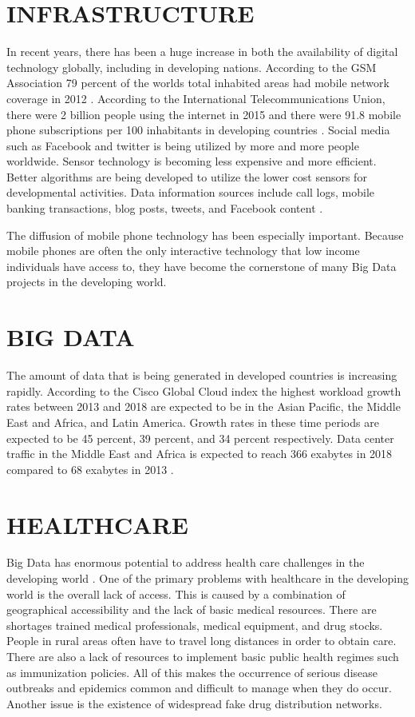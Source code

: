\documentclass[sigconf]{acmart}
\begin{document}
\section{INFRASTRUCTURE}
In recent years, there has been a huge increase in both the availability of digital technology globally, including in developing nations. According to the GSM Association 79 percent of the worlds total inhabited areas had mobile network coverage in 2012 \cite{DevEcon}. According to the International Telecommunications Union, there were 2 billion people using the internet in 2015 and there were 91.8 mobile phone subscriptions per 100 inhabitants in developing countries \cite{DevEcon}.  Social media such as Facebook and twitter is being utilized by more and more people worldwide. Sensor technology is becoming less expensive and more efficient. Better algorithms are being developed to utilize the lower cost sensors for developmental activities. Data information sources include call logs, mobile banking transactions, blog posts, tweets, and Facebook content \cite{www-google-GloPls}.

The diffusion of mobile phone technology has been especially important.  Because mobile phones are often the only interactive technology that low income individuals have access to, they have become the cornerstone of many Big Data projects in the developing world.

\section{BIG DATA}
The amount of data that is being generated in developed countries is increasing rapidly.  According to the Cisco Global Cloud index the highest workload growth rates between 2013 and 2018 are expected to be in the Asian Pacific, the Middle East and Africa, and Latin America.  Growth rates in these time periods are expected to be 45 percent, 39 percent, and 34 percent respectively.  Data center traffic in the Middle East and Africa is expected to reach 366 exabytes in 2018 compared to 68 exabytes in 2013 \cite{DevEcon}. 

\section{HEALTHCARE}

Big Data has enormous potential to address health care challenges in the developing world \cite{DevEcon}. One of the primary problems with healthcare in the developing world is the overall lack of access. This is caused by a combination of geographical accessibility and the lack of basic medical resources. There are shortages trained medical professionals, medical equipment, and drug stocks. People in rural areas often have to travel long distances in order to obtain care. There are also a lack of resources to implement basic public health regimes such as immunization policies.  All of this makes the occurrence of serious disease outbreaks and epidemics common and difficult to manage when they do occur.  Another issue is the existence of widespread fake drug distribution networks.
\end{document}
